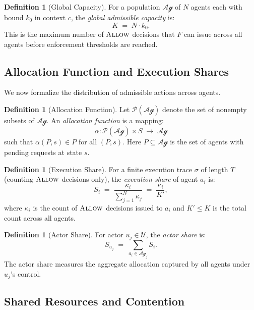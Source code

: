 \documentclass[11pt]{article}
\theoremstyle{plain}
\theoremstyle{definition}
\newtheorem{definition}[theorem]{Definition}
\theoremstyle{remark}
\newcommand{\Allow}{\textsc{Allow}}
\newcommand{\Agents}{\mathcal{Ag}}         %
\newcommand{\Actors}{\mathcal{U}}          %
\newcommand{\Share}[1]{S_{#1}}             %
\newcommand{\kbound}{k_0}                  %
\newcommand{\Kcap}{K}                      %
\newcommand{\alloc}{\alpha}                %
\begin{document}
\begin{definition}[Global Capacity]
\label{def:globalcap}
For a population $\Agents$ of $N$ agents each with bound $\kbound$ in
context $c$, the \emph{global admissible capacity} is:
\[
  \Kcap \;=\; N \cdot \kbound.
\]
This is the maximum number of $\Allow$ decisions that $F$ can issue
across all agents before enforcement thresholds are reached.
\end{definition}

\subsection{Allocation Function and Execution Shares}
\label{sec:shares}

We now formalize the distribution of admissible actions across agents.

\begin{definition}[Allocation Function]
\label{def:alloc}
Let $\mathcal{P}(\Agents)$ denote the set of nonempty subsets of
$\Agents$.  An \emph{allocation function} is a mapping:
\[
  \alloc : \mathcal{P}(\Agents) \times S \;\to\; \Agents
\]
such that $\alloc(P, s) \in P$ for all $(P, s)$.  Here $P \subseteq
\Agents$ is the set of agents with pending requests at state $s$.
\end{definition}

\begin{definition}[Execution Share]
\label{def:share}
For a finite execution trace $\sigma$ of length $T$ (counting
$\Allow$ decisions only), the \emph{execution share} of agent $a_i$ is:
\[
  \Share{i} \;=\; \frac{\kappa_i}{\sum_{j=1}^{N} \kappa_j} \;=\;
  \frac{\kappa_i}{\Kcap'},
\]
where $\kappa_i$ is the count of $\Allow$ decisions issued to $a_i$
and $\Kcap' \leq \Kcap$ is the total count across all agents.
\end{definition}

\begin{definition}[Actor Share]
\label{def:actorshare}
For actor $u_j \in \Actors$, the \emph{actor share} is:
\[
  \Share{u_j} \;=\; \sum_{a_i \in \Agents_j} \Share{i}.
\]
The actor share measures the aggregate allocation captured by all
agents under $u_j$'s control.
\end{definition}

\subsection{Shared Resources and Contention}
\label{sec:resources}
\end{document}
